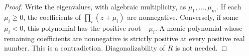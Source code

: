 \begin{proof}
Write the eigenvalues, with algebraic multiplicity, as
$\mu_1,\ldots,\mu_m$.  If each $\mu_i\ge0$, the coefficients of
$\prod_i(z+\mu_i)$ are nonnegative.  Conversely, if some $\mu_i<0$,
this polynomial has the positive root $-\mu_i$.  A monic polynomial
whose remaining coefficients are nonnegative is strictly positive at
every positive real number.  This is a contradiction.  Diagonalizability
of $R$ is not needed.
\end{proof}
